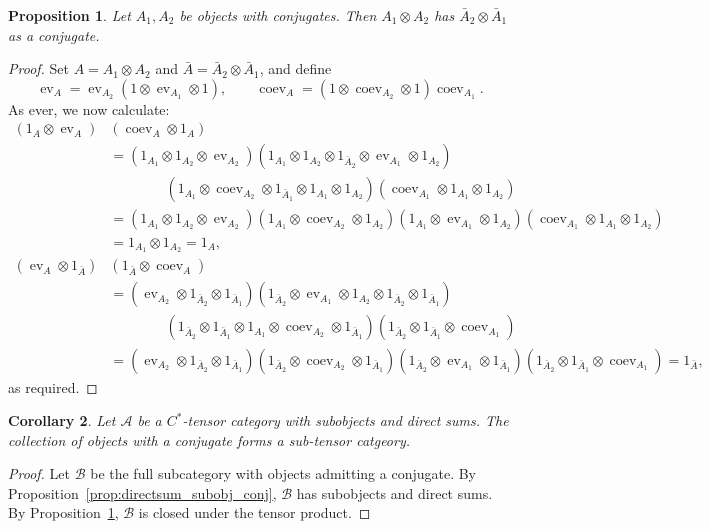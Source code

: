 \documentclass[a4paper,11pt]{article}
\theoremstyle{plain}
\newtheorem{proposition}{Proposition}[section]
\newtheorem{corollary}[proposition]{Corollary}
\theoremstyle{remark}
\newcommand{\mc}[1]{\mathcal{#1}}
\newcommand{\ev}{\operatorname{ev}}
\newcommand{\coev}{\operatorname{coev}}
\newcommand{\conj}[1]{\bar{#1}}
\begin{document}
\begin{proposition}\label{prop:tensor_conj}
Let $A_1, A_2$ be objects with conjugates.  Then $A_1 \otimes A_2$ has $\conj{A}_2 \otimes \conj{A}_1$ as a conjugate.
\end{proposition}
\begin{proof}
Set $A = A_1 \otimes A_2$ and $\conj A = \conj{A}_2 \otimes \conj{A}_1$, and define
\[ \ev_A = \ev_{A_2}(1\otimes\ev_{A_1}\otimes 1), \qquad
\coev_A = (1\otimes\coev_{A_2}\otimes 1)\coev_{A_1}. \]
As ever, we now calculate:
\begin{align*}
(1_A\otimes\ev_A) & (\coev_A\otimes 1_A) \\
&= (1_{A_1}\otimes 1_{A_2} \otimes \ev_{A_2}) (1_{A_1}\otimes 1_{A_2} \otimes 1_{\conj A_2} \otimes \ev_{A_1} \otimes 1_{A_2})
  \\ &\qquad\qquad
  (1_{A_1} \otimes \coev_{A_2} \otimes 1_{\conj A_1} \otimes 1_{A_1}\otimes 1_{A_2})
  (\coev_{A_1}\otimes 1_{A_1}\otimes 1_{A_2}) \\
&= (1_{A_1}\otimes 1_{A_2} \otimes \ev_{A_2})
  (1_{A_1} \otimes \coev_{A_2} \otimes 1_{A_2})
  (1_{A_1} \otimes \ev_{A_1} \otimes 1_{A_2})
  (\coev_{A_1}\otimes 1_{A_1}\otimes 1_{A_2}) \\
&= 1_{A_1} \otimes 1_{A_2} = 1_A,
\\
(\ev_A\otimes 1_{\conj A}) & (1_{\conj A}\otimes\coev_A) \\
&= (\ev_{A_2}\otimes 1_{\conj A_2}\otimes 1_{\conj A_1})
  (1_{\conj A_2} \otimes \ev_{A_1} \otimes 1_{A_2}\otimes 1_{\conj A_2}\otimes 1_{\conj A_1})
  \\ &\qquad\qquad
  (1_{\conj A_2}\otimes 1_{\conj A_1}\otimes 1_{A_1} \otimes \coev_{A_2} \otimes 1_{\conj A_1})
  (1_{\conj A_2}\otimes 1_{\conj A_1}\otimes \coev_{A_1}) \\
&= (\ev_{A_2}\otimes 1_{\conj A_2}\otimes 1_{\conj A_1})
  (1_{\conj A_2}\otimes \coev_{A_2} \otimes 1_{\conj A_1})
  (1_{\conj A_2} \otimes \ev_{A_1} \otimes 1_{\conj A_1})
  (1_{\conj A_2}\otimes 1_{\conj A_1}\otimes \coev_{A_1}) = 1_{\conj A},
\end{align*}
as required.
\end{proof}

\begin{corollary}
Let $\mc A$ be a $C^*$-tensor category with subobjects and direct sums.  The collection of objects with a conjugate forms a sub-tensor catgeory.
\end{corollary}
\begin{proof}
Let $\mc B$ be the full subcategory with objects admitting a conjugate.  By Proposition~\ref{prop:directsum_subobj_conj}, $\mc B$ has subobjects and direct sums.  By Proposition~\ref{prop:tensor_conj}, $\mc B$ is closed under the tensor product.
\end{proof}
\end{document}
